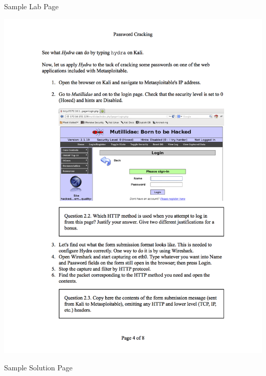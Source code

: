 \documentclass{beamer}
\begin{document}
	\begin{frame}{Sample Lab Page}
		\begin{center}
		\includegraphics[width=\textwidth, clip=true, trim=0 1in 0 5in]{lab7-sample-page.png}
		\end{center}		
	\end{frame}	
	
	\begin{frame}{Sample Solution Page}
		\begin{center}
		\end{center}		
	\end{frame}
	
\end{document}

